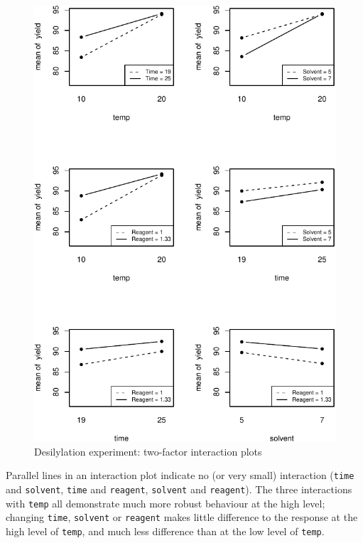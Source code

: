 \documentclass[
]{book}
\theoremstyle{definition}
\theoremstyle{definition}
\theoremstyle{definition}
\theoremstyle{definition}
\theoremstyle{remark}
\begin{document}
\begin{figure}

{\centering \includegraphics{bookdown_math3014-6027_files/figure-latex/desilylation-2fi-plots-1} 

}

\caption{Desilylation experiment: two-factor interaction plots}\label{fig:desilylation-2fi-plots}
\end{figure}

Parallel lines in an interaction plot indicate no (or very small) interaction (\texttt{time} and \texttt{solvent}, \texttt{time} and \texttt{reagent}, \texttt{solvent} and \texttt{reagent}). The three interactions with \texttt{temp} all demonstrate much more robust behaviour at the high level; changing \texttt{time}, \texttt{solvent} or \texttt{reagent} makes little difference to the response at the high level of \texttt{temp}, and much less difference than at the low level of \texttt{temp}.
\end{document}
